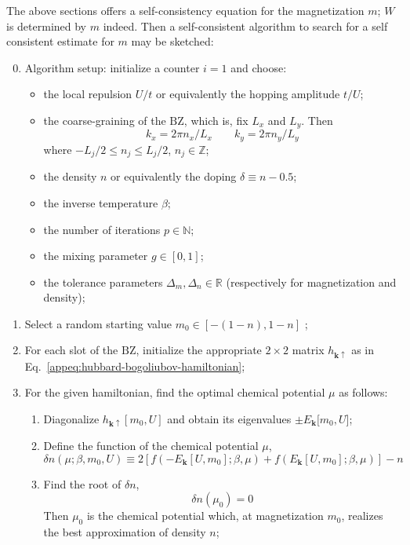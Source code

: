 The above sections offers a self-consistency equation for the magnetization $m$; $W$ is determined by $m$ indeed. Then a self-consistent algorithm to search for a self consistent estimate for $m$ may be sketched:
\begin{enumerate}
	\setcounter{enumi}{-1}
	\item Algorithm setup: initialize a counter $i=1$ and choose:
	\begin{itemize}
		\item the local repulsion $U/t$ or equivalently the hopping amplitude $t/U$;
		\item the coarse-graining of the $\mathrm{BZ}$, which is, fix $L_x$ and $L_y$. Then 
		\[ 
			k_x = 2\pi n_x/L_x
			\qquad
			k_y = 2\pi n_y/L_y 
		\]
		where $-L_j/2 \le n_j \le L_j/2$, $n_j \in \mathbb{Z}$;
		\item the density $n$ or equivalently the doping $\delta \equiv n-0.5$;
		\item the inverse temperature $\beta$;
		\item the number of iterations $p \in \mathbb{N}$; 
		\item the mixing parameter $g \in [0,1]$;
		\item the tolerance parameters $\Delta_m, \Delta_n \in \mathbb{R}$ (respectively for magnetization and density);
	\end{itemize}
	\item {\color{tabred}
		Select a random starting value $m_0 \in [-(1-n),1-n]$
	};
	\item For each slot of the $\mathrm{BZ}$, initialize the appropriate $2\times2$ matrix $h_{\mathbf{k}\uparrow}$ as in Eq.~\eqref{appeq:hubbard-bogoliubov-hamiltonian};
	\item For the given hamiltonian, find the optimal chemical potential $\mu$ as follows:
	\begin{enumerate}
		\item Diagonalize $h_{\mathbf{k}\uparrow}[m_0, U]$ and obtain its eigenvalues $\pm E_\mathbf{k}[m_0, U$]; 
		\item Define the function of the chemical potential $\mu$,
		\[
			\delta n(\mu; \beta, m_0, U) \equiv 2 \left[
			f\left(-E_\mathbf{k}[U,m_0]; \beta,\mu \right) + f \left( E_\mathbf{k}[U,m_0]; \beta,\mu \right)
			\right] - n
		\]
		\item Find the root of $\delta n$, 
		\[
			\delta n(\mu_0) = 0
		\]
		Then $\mu_0$ is the chemical potential which, at magnetization $m_0$, realizes the best approximation of density $n$;
	\end{enumerate}

\end{enumerate}
